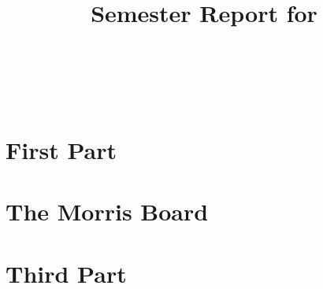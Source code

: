 



%


\title{{\small \textbf{Semester Report for \studentname}\\[-2ex]
\studyname}\\[\baselineskip]{\huge\textbf{\projectname}}\\{\huge\textbf{\projectnameextension}}}

\maketitle\newpage\tableofcontents\newpage

\part{First Part}


\part{The Morris Board}




\part{Third Part}



\printbibliography \label{Bibliography}

 